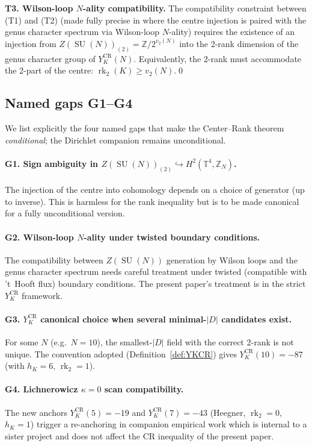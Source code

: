 \documentclass[11pt,a4paper,reqno]{amsart}
\theoremstyle{definition}
\DeclareMathOperator{\SU}{SU}
\DeclareMathOperator{\rk}{rk}
\newcommand{\ZZ}{\mathbb{Z}}
\newcommand{\TT}{\mathbb{T}}
\newcommand{\vtwo}{v_2}
\newcommand{\YKCR}{Y_K^{\mathrm{CR}}}
\begin{document}
\smallskip
\noindent\textbf{T3. Wilson-loop $N$-ality compatibility.}
The compatibility constraint between (T1) and (T2) (made fully precise in
\cite{Remondiere2026Survey} where the centre injection is paired with the
genus character spectrum via Wilson-loop $N$-ality) requires the existence of
an injection from $Z(\SU(N))_{(2)}=\ZZ/2^{\vtwo(N)}$ into the 2-rank
dimension of the genus character group of $\YKCR(N)$.  Equivalently, the
2-rank must accommodate the 2-part of the centre:
$\rk_2(K)\ge\vtwo(N)$.\qed

\subsection{Named gaps G1--G4}\label{ss:gaps}

We list explicitly the four named gaps that make the Center--Rank theorem
\emph{conditional}; the Dirichlet companion remains unconditional.

\paragraph{G1. Sign ambiguity in $Z(\SU(N))_{(2)}\hookrightarrow H^2(\TT^4,\ZZ_N)$.}
The injection of the centre into cohomology depends on a choice of generator
(up to inverse).  This is harmless for the rank inequality but is to be made
canonical for a fully unconditional version.

\paragraph{G2. Wilson-loop $N$-ality under twisted boundary conditions.}
The compatibility between $Z(\SU(N))$ generation by Wilson loops and the
genus character spectrum needs careful treatment under twisted (compatible
with 't~Hooft flux) boundary conditions.  The present paper's treatment is
in the strict $\YKCR$ framework.

\paragraph{G3. $\YKCR$ canonical choice when several minimal-$|D|$ candidates exist.}
For some $N$ (e.g.\ $N=10$), the smallest-$|D|$ field with the correct 2-rank
is not unique.  The convention adopted (Definition~\ref{def:YKCR}) gives
$\YKCR(10)=-87$ (with $h_K=6$, $\rk_2=1$).

\paragraph{G4. Lichnerowicz $\kappa=0$ scan compatibility.}
The new anchors $\YKCR(5)=-19$ and $\YKCR(7)=-43$ (Heegner, $\rk_2=0$,
$h_K=1$) trigger a re-anchoring in companion empirical work
\cite{Remondiere2026Transport} which is internal to a sister project and
does not affect the CR inequality of the present paper.
\end{document}
